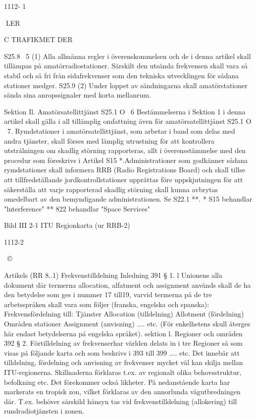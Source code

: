 \documentclass[a4paper,twoside,twocolumn,openright]{book}
\begin{document}
{{{{{1112- 1

LER

C TRAFIKMET DER

S25.8 \ 5
(1) Alla allmänna regler i överenskommelsen och de i denna artikel skall
tillämpas på amatörradiostationer. Särskilt
den utsända frekvensen skall vara så stabil
och så fri från sidafrekvenser som den tekniska utvecklingen för sådana stationer medger.
S25.9
(2) Under loppet av sändningarna skall amatörstationer sända sina anropssignaler med korta mellanrum.

Sektion Il. Amatörsatellittjänst
S25.1 O \ 6 Bestämmelserna i Sektion 1 i
denna artikel skall gälla i all tillämplig omfattning även för amatörsatellittjänst
S25.1 O \ 7. Rymdstationer i amatörsatellittjänst, som arbetar i band som delas med
andra tjänster, skall förses med lämplig utrustning för att kontrollera utstrålningen om
skadlig störning rapporteras, allt i överensstämmelse med den procedur som föreskrivs i Artikel S15 *.Administrationer som
godkänner sådana rymdstationer skall informera RRB (Radio Registrations Board)
och skall tillse att tillfredställande jordkontrollstationer upprättas före uppskjutningen för
att säkerställa att varje rapporterad skadlig
störning skall kunna avbrytas omedelbart av
den bemyndigande administrationen. Se
S22.1 **.
* S15 behandlar "lnterference"
** 822 behandlar "Space Services"

Bild III 2-1 ITU Regionkarta (ur RRB-2)

1112-2

~©

Artikels (RR 8..1) Frekvenstilldelning
Inledning
391 § 1. l Unionens alla dokument där
termerna allocation, alfatment och assignment används skall de ha den betydelse
som ges i nummer 17 till19, varvid termerna
på de tre arbetsspråken skall vara som följer
(franska, engelska och spanska):
Frekvensfördelning till:
Tjänster
Allocation (tilldelning)
Allotment
(fördelning)
Områden
stationer
Assignment (anvisning) .... etc.
(För enkelhetens skull återges här endast
betydelserna på engelska språket).
sektion l. Regioner och områden
392 § 2. Förtilldelning av frekvenserhar
världen delats in i tre Regioner så som visas
på följande karta och som beskrivs i 393 till
399 .... etc.
Det innebär att tilldelning, fördelning och
anvisning av frekvenser mycket väl kan skilja
mellan ITU-regionerna. Skillnaderna förklaras t.ex. av regionalt olika behovsstruktur,
befolkning etc.
Det förekommer också likheter. På nedanstående karta har markerats en tropisk
zon, vilket förklaras av den annorlunda vågutbredningen där. T.ex. behöver särskild
hänsyn tas vid frekvenstilldelning (allokering) till rundradiotjänsten i zonen.

}}}}}
\end{document}
